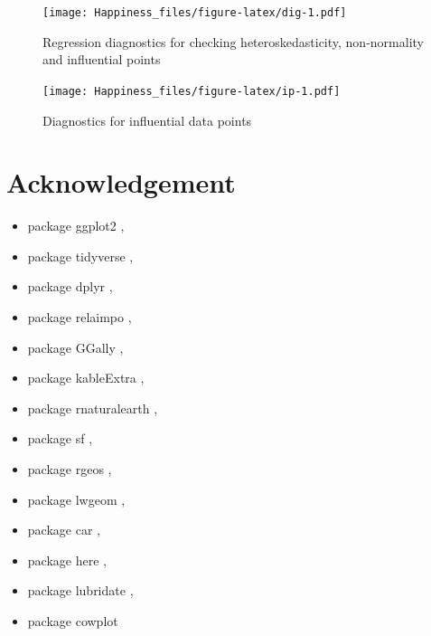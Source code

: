 \documentclass[11pt,a4paper,]{article}
\providecommand{\tightlist}{%
  \setlength{\itemsep}{0pt}\setlength{\parskip}{0pt}}
\begin{document}
\begin{figure}
\centering
\texttt{[image: Happiness\_files/figure-latex/dig-1.pdf]}
\caption{\label{fig:dig}Regression diagnostics for checking heteroskedasticity, non-normality and influential points}
\end{figure}

\begin{figure}
\centering
\texttt{[image: Happiness\_files/figure-latex/ip-1.pdf]}
\caption{\label{fig:ip}Diagnostics for influential data points}
\end{figure}

\clearpage

\hypertarget{acknowledgement}{%
\section{Acknowledgement}\label{acknowledgement}}

\begin{itemize}
\tightlist
\item
  package ggplot2 \autocite{ggplot2},
\item
  package tidyverse \autocite{tidyverse},
\item
  package dplyr \autocite{dplyr},
\item
  package relaimpo \autocite{relaimpo},
\item
  package GGally \autocite{GGally},
\item
  package kableExtra \autocite{kableExtra},
\item
  package rnaturalearth \autocite{rnaturalearth},
\item
  package sf \autocite{sf},
\item
  package rgeos \autocite{rgeos},
\item
  package lwgeom \autocite{lwgeom},
\item
  package car \autocite{car},
\item
  package here \autocite{here},
\item
  package lubridate \autocite{lubridate},
\item
  package cowplot \autocite{cowplot}
\end{itemize}

\printbibliography
\end{document}
